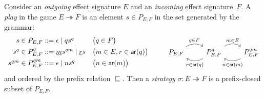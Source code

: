 \documentclass[acmsmall,screen,review,nonacm]{acmart}
\newcommand{\kw}[1]{\ensuremath{ \mathsf{#1} }}
\begin{document}
\begin{definition}[Strategy] \label{def:strat} %
Consider an \emph{outgoing} effect signature $E$
and an \emph{incoming} effect signature~$F$.
A \emph{play} in the game $E \twoheadrightarrow F$
is an element $s \in P_{E,F}$
in the set generated by the grammar:
\[
  \begin{array}{r@{}ll}
    s \in P_{E,F} &{} ::= \epsilon \mid q s^q &
    \bigl( q \in F \bigr)
  \\[1ex]
    s^q \in P_{E,F}^q &{} ::= \underline{m} s^{qm} \mid \underline{r} s &
    \bigl( m \in E, r \in \kw{ar}(q) \bigr)
  \\[1ex]
    s^{qm} \in P_{E,F}^{qm} &{} ::= \epsilon \mid n s^q &
    \bigl( n \in \kw{ar}(m) \bigr)
  \end{array}
  \qquad
  \begin{tikzcd}
    P_{E,F} \ar[r, bend left, "q \in F"] &
    P_{E,F}^q \ar[r, bend left, "m \in E"] \ar[l, bend left, "r \in \kw{ar}(q)"] &
    P_{E,F}^{qm} \ar[l, bend left, "n \in \kw{ar}(m)"]
  \end{tikzcd}
\]
and ordered by the prefix relation $\sqsubseteq$.
Then a \emph{strategy} $\sigma : E \twoheadrightarrow F$
is a prefix-closed subset of $P_{E,F}$.
\end{definition}
\end{document}

